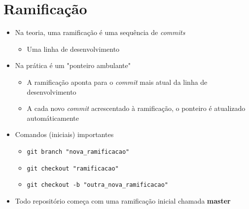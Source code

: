 \documentclass{beamer}
\newenvironment{slide}{\begin{frame}{\insertsection}}{\end{frame}}
\begin{document}
\section{Ramificação}
\begin{slide}
    \begin{itemize}
        \item Na teoria, uma ramificação é uma sequência de \emph{commits}
        \begin{itemize}
            \pause
            \item Uma linha de desenvolvimento
        \end{itemize}
        \pause
        \item Na prática é um "ponteiro ambulante"
        \begin{itemize}
            \pause
            \item A ramificação aponta para o \emph{commit} mais atual da linha
                de desenvolvimento
            \pause
            \item A cada novo \emph{commit} acrescentado à ramificação, o
                ponteiro é atualizado automáticamente
        \end{itemize}
        \pause
        \item Comandos (iniciais) importantes
        \begin{itemize}
            \pause
            \item \texttt{git branch "nova\_ramificacao"}
            \pause
            \item \texttt{git checkout "ramificacao"}
            \pause
            \item \texttt{git checkout -b "outra\_nova\_ramificacao"}
        \end{itemize}
        \pause
        \item Todo repositório começa com uma ramificação inicial chamada
            \textbf{master}
    \end{itemize}
\end{slide}
\end{document}
